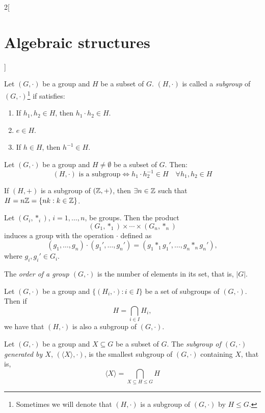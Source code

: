 \documentclass[../../../main.tex]{subfiles}
\begin{document}
\begin{multicols}{2}[\section{Algebraic structures}]
\begin{lemma}
\begin{enumerate}
    \end{enumerate}
\end{lemma}
\begin{definition}[Subgroup]
    Let $(G,\cdot)$ be a group and $H$ be a subset of $G$. $(H,\cdot)$ is called a \textit{subgroup} of $(G,\cdot)$\footnote{Sometimes we will denote that $(H,\cdot)$ is a subgroup of $(G,\cdot)$ by $H\leq G$.} if satisfies:
    \begin{enumerate}
        \item If $h_1,h_2\in H$, then $h_1\cdot h_2\in H$.
        \item $e\in H$.
        \item If $h\in H$, then $h^{-1}\in H$.
    \end{enumerate}
\end{definition}
\begin{prop}
    Let $(G,\cdot)$ be a group and $H\ne\emptyset$ be a subset of $G$. Then: $$(H,\cdot)\text{ is a subgroup}\iff h_1\cdot h_2^{-1}\in H\quad\forall h_1,h_2\in H$$
\end{prop}
\begin{prop}
    If $(H,+)$ is a subgroup of $(\mathbb{Z} ,+)$, then $\exists n\in\mathbb{Z} $ such that $H=n\mathbb{Z} =\{nk:k\in\mathbb{Z} \}$.
\end{prop}
\begin{prop}
    Let $(G_i,*_i)$, $i=1,\ldots, n$, be groups. Then the product $$(G_1,*_1)\times\cdots\times(G_n,*_n)$$ induces a group with the operation $\cdot$ defined as $$(g_1,\ldots,g_n)\cdot(g_1',\ldots,g_n')=(g_1*_1g_1',\ldots,g_n*_ng_n'),$$ where $g_i,g_i'\in G_i$.
\end{prop}
\begin{definition}
    The \textit{order of a group $(G,\cdot)$} is the number of elements in its set, that is, $|G|$.
\end{definition}
\begin{lemma}
    Let $(G,\cdot)$ be a group and $\{(H_i,\cdot):i\in I\}$ be a set of subgroups of $(G,\cdot)$. Then if $$H=\displaystyle\bigcap_{i\in I}H_i,$$ we have that $(H,\cdot)$ is also a subgroup of $(G,\cdot)$.
\end{lemma}
\begin{definition}
    Let $(G,\cdot)$ be a group and $X\subseteq G$ be a subset of $G$. The \textit{subgroup of $(G,\cdot)$ generated by $X$}, $(\langle X\rangle,\cdot)$, is the smallest subgroup of $(G,\cdot)$ containing $X$, that is, $$\langle X\rangle=\bigcap_{X\subseteq H\leq G}H$$
\end{definition}
\begin{definition}

\end{definition}
\end{multicols}
\end{document}
